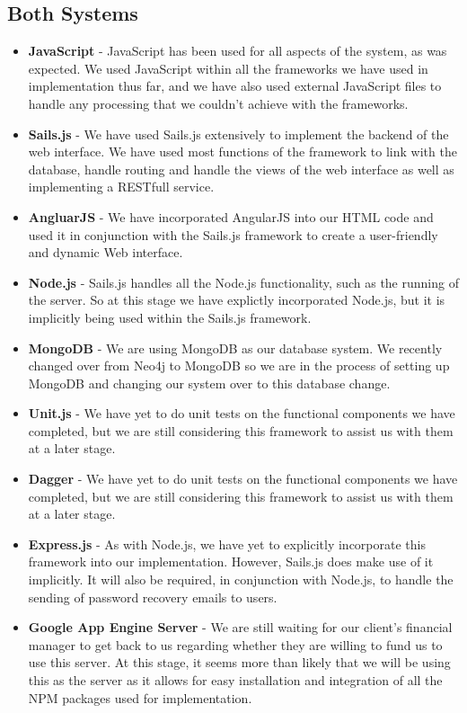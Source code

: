 \documentclass[11pt,fleqn]{book} %
\begin{document}
		\subsection{Both Systems}
			\begin{itemize}
				\item\textbf{JavaScript} -
				JavaScript has been used for all aspects of the system, as was expected. We used JavaScript within all the frameworks we have used in implementation thus far, and we have also used external JavaScript files to handle any processing that we couldn't achieve with the frameworks.
				
				\item\textbf{Sails.js} -
				We have used Sails.js extensively to implement the backend of the web interface. We have used most functions of the framework to link with the database, handle routing and handle the views of the web interface as well as implementing a RESTfull service.
				
				\item\textbf{AngluarJS} -
				We have incorporated AngularJS into our HTML code and used it in conjunction with the Sails.js framework to create a user-friendly and dynamic Web interface.
				
				\item\textbf{Node.js} -
				Sails.js handles all the Node.js functionality, such as the running of the server. So at this stage we have explictly incorporated Node.js, but it is implicitly being used within the Sails.js framework.				
				
				\item\textbf{MongoDB} -
				We are using MongoDB as our database system. We recently changed over from Neo4j to MongoDB so we are in the process of setting up MongoDB and changing our system over to this database change.
				
				\item\textbf{Unit.js} -
				We have yet to do unit tests on the functional components we have completed, but we are still considering this framework to assist us with them at a later stage.
				
				\item\textbf{Dagger} -
				We have yet to do unit tests on the functional components we have completed, but we are still considering this framework to assist us with them at a later stage.
				
				\item\textbf{Express.js} -
				As with Node.js, we have yet to explicitly incorporate this framework into our implementation. However, Sails.js does make use of it implicitly. It will also be required, in conjunction with Node.js, to handle the sending of password recovery emails to users.
				
				\item\textbf{Google App Engine Server} -
				We are still waiting for our client's financial manager to get back to us regarding whether they are willing to fund us to use this server. At this stage, it seems more than likely that we will be using this as the server as it allows for easy installation and integration of all the NPM packages used for implementation.			
			\end{itemize}	
	
\end{document}
